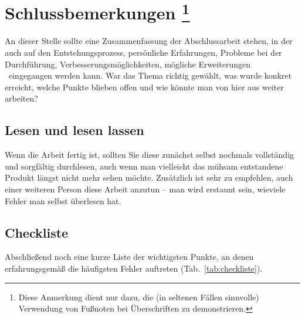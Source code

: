 \chapter[Schlussbemerkungen]%
        {Schlussbemerkungen%
        \protect\footnote{Diese Anmerkung dient nur dazu, die (in seltenen Fällen sinnvolle)
				Verwendung von Fußnoten bei Überschriften zu demonstrieren.}}%
\label{cha:Schluss}

An dieser Stelle sollte eine Zusammenfassung der Abschlussarbeit
stehen, in der auch auf den Entstehungsprozess, persönliche
Erfahrungen, Probleme bei der Durchführung,
Verbesserungsmöglichkeiten, mögliche %
Erweiterungen \usw\ eingegangen werden kann. War das Thema richtig
gewählt, was wurde konkret erreicht, welche Punkte blieben offen
und wie könnte man von hier aus weiter arbeiten?


\section{Lesen und lesen lassen}

Wenn die Arbeit fertig ist, sollten Sie diese zunächst selbst nochmals vollständig und sorgfältig durchlesen, auch wenn man vielleicht das mühsam entstandene Produkt längst nicht mehr sehen möchte. Zusätzlich ist sehr zu empfehlen, auch einer weiteren Person diese Arbeit anzutun -- man wird erstaunt sein, wieviele Fehler man selbst überlesen hat. 



\section{Checkliste}

Abschließend noch eine kurze Liste der wichtigsten Punkte, an denen erfahrungsgemäß die häufigsten Fehler auftreten (Tab.\ \ref{tab:checkliste}).


